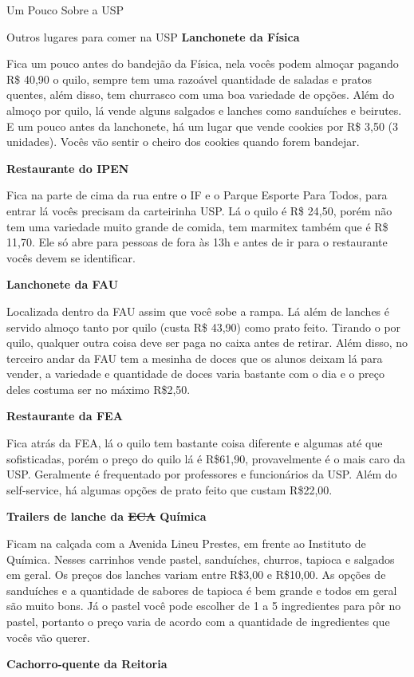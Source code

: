 \begin{secao}{Um Pouco Sobre a USP}
\begin{subsecao}{Outros lugares para comer na USP}
\textbf{Lanchonete da Física}

Fica um pouco antes do bandejão da Física, nela vocês podem almoçar pagando R\$
40,90 o quilo, sempre tem uma razoável quantidade de saladas e pratos
quentes, além disso, tem churrasco com uma boa variedade de opções.
Além do almoço por quilo, lá vende alguns salgados e lanches como sanduíches e
beirutes. E um pouco antes da lanchonete, há um lugar que vende cookies por R\$
3,50 (3 unidades). Vocês vão sentir o cheiro dos cookies quando forem bandejar.

\textbf{Restaurante do IPEN}

Fica na parte de cima da rua entre o IF e o Parque Esporte Para Todos, para
entrar lá vocês precisam da carteirinha USP. Lá o quilo é R\$ 24,50, porém não
tem uma variedade muito grande de comida, tem marmitex também que é R\$ 11,70.
Ele só abre para pessoas de fora às 13h e antes de ir para o restaurante vocês
devem se identificar.

\textbf{Lanchonete da FAU}

Localizada dentro da FAU assim que você sobe a rampa. Lá além de lanches é
servido almoço tanto por quilo (custa R\$ 43,90) como prato feito. Tirando o por
quilo, qualquer outra coisa deve ser paga no caixa antes de retirar. Além
disso, no terceiro andar da FAU tem a mesinha de doces que os alunos deixam lá
para vender, a variedade e quantidade de doces varia bastante com o dia e o
preço deles costuma ser no máximo R\$2,50.

\textbf{Restaurante da FEA}

Fica atrás da FEA, lá o quilo tem bastante coisa diferente e algumas até que
sofisticadas, porém o preço do quilo lá é R\$61,90, provavelmente é o mais caro
da USP. Geralmente é frequentado por professores e funcionários da USP. Além do
self-service, há algumas opções de prato feito que custam R\$22,00.

\textbf{Trailers de lanche da \sout{ECA} Química}

Ficam na calçada com a Avenida Lineu Prestes, em frente ao Instituto de
Química. Nesses carrinhos vende pastel, sanduíches, churros, tapioca e salgados
em geral. Os preços dos lanches variam entre R\$3,00 e R\$10,00. As opções de
sanduíches e a quantidade de sabores de tapioca é bem grande e todos em geral
são muito bons. Já o pastel você pode escolher de 1 a 5 ingredientes para pôr
no pastel, portanto o preço varia de acordo com a quantidade de ingredientes que
vocês vão querer.

\textbf{Cachorro-quente da Reitoria}


\end{subsecao}
\end{secao}
